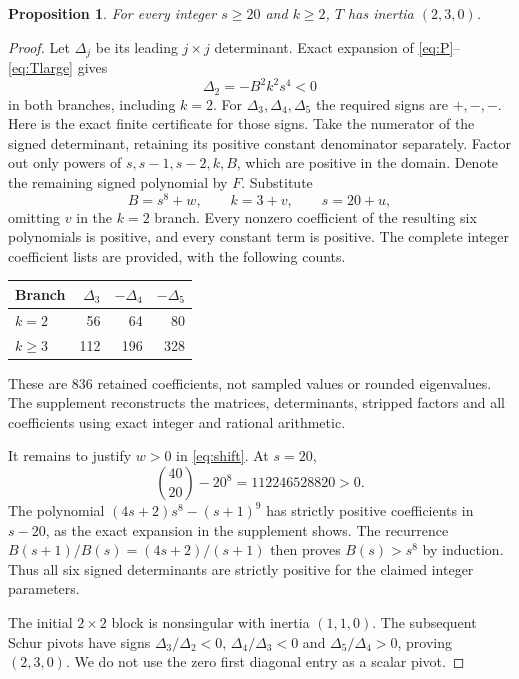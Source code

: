 \documentclass[11pt]{article}
\newtheorem{proposition}[theorem]{Proposition}
\theoremstyle{remark}\newtheorem{remark}[theorem]{Remark}
\begin{document}
\begin{proposition}\label{prop:large}
For every integer $s\ge20$ and $k\ge2$, $T$ has inertia $(2,3,0)$.
\end{proposition}
\begin{proof}
Let $\Delta_j$ be its leading $j\times j$ determinant.
Exact expansion of \eqref{eq:P}--\eqref{eq:Tlarge} gives
\[
 \Delta_2=-B^2k^2s^4<0
\]
in both branches, including $k=2$.
For $\Delta_3,\Delta_4,\Delta_5$ the required signs are $+,-,-$.
Here is the exact finite certificate for those signs.
Take the numerator of the signed determinant, retaining its
positive constant denominator separately. Factor out only powers
of $s,s-1,s-2,k,B$, which are positive in the domain. Denote the
remaining signed polynomial by $F$. Substitute
\begin{equation}
 B=s^8+w,\qquad k=3+v,\qquad s=20+u,                 \label{eq:shift}
\end{equation}
omitting $v$ in the $k=2$ branch.
Every nonzero coefficient of the resulting six polynomials is
positive, and every constant term is positive. The complete
integer coefficient lists are provided, with the following counts.
\begin{center}
\begin{tabular}{@{}lrrr@{}}
\toprule
Branch & $\Delta_3$ & $-\Delta_4$ & $-\Delta_5$\\
\midrule
$k=2$ & 56 & 64 & 80\\
$k\ge3$ & 112 & 196 & 328\\
\bottomrule
\end{tabular}
\end{center}
These are 836 retained coefficients, not sampled values or rounded
eigenvalues. The supplement reconstructs the matrices,
determinants, stripped factors and all coefficients using exact
integer and rational arithmetic.

It remains to justify $w>0$ in \eqref{eq:shift}.
At $s=20$,
\[
 \binom{40}{20}-20^8=112246528820>0.
\]
The polynomial $(4s+2)s^8-(s+1)^9$ has strictly positive
coefficients in $s-20$, as the exact expansion in the supplement
shows. The recurrence $B(s+1)/B(s)=(4s+2)/(s+1)$ then proves
$B(s)>s^8$ by induction. Thus all six signed determinants are
strictly positive for the claimed integer parameters.

The initial $2\times2$ block is nonsingular with inertia $(1,1,0)$.
The subsequent Schur pivots have signs
$\Delta_3/\Delta_2<0$, $\Delta_4/\Delta_3<0$ and
$\Delta_5/\Delta_4>0$, proving $(2,3,0)$.
We do not use the zero first diagonal entry as a scalar pivot.
\end{proof}
\end{document}
